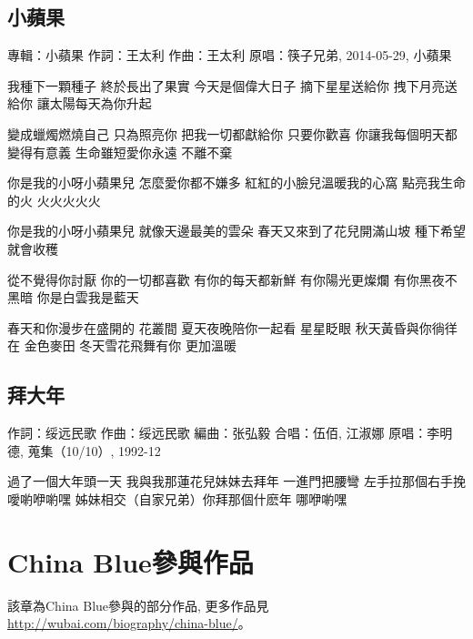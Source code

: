 \documentclass[UTF8,a4paper,oneside,twocolumn,12pt]{ctexbook}
\newcommand{\infopair}[2]{\textbullet #1：#2}
\newcommand{\zc}[1][伍佰]{\infopair{作詞}{#1}}
\newcommand{\zq}[1][伍佰]{\infopair{作曲}{#1}}
\newcommand{\bq}[1][伍佰]{\infopair{編曲}{#1}}
\newcommand{\zj}[1]{\infopair{專輯}{#1}}
\newcommand{\yc}[1]{\infopair{原唱}{#1}}
\newcommand{\sj}[1]{\infopair{時間}{#1}}
\newenvironment{info}{\begin{flushleft}\kaishu
	}
	{\end{flushleft}\normalsize\yahei\par}
\newenvironment{lyric}{
	}
{}
\begin{document}
\section{小蘋果}
\begin{info}
	\zj{小蘋果}
	\zc[王太利]
	\zq[王太利]
	\yc{筷子兄弟, 2014-05-29, 小蘋果}
\end{info}
\begin{lyric}
	我種下一顆種子 終於長出了果實
	今天是個偉大日子
	摘下星星送給你 拽下月亮送給你
	讓太陽每天為你升起

	變成蠟燭燃燒自己 只為照亮你
	把我一切都獻給你 只要你歡喜
	你讓我每個明天都 變得有意義
	生命雖短愛你永遠 不離不棄

	你是我的小呀小蘋果兒
	怎麼愛你都不嫌多
	紅紅的小臉兒溫暖我的心窩
	點亮我生命的火 火火火火火

	你是我的小呀小蘋果兒
	就像天邊最美的雲朵
	春天又來到了花兒開滿山坡
	種下希望就會收穫

	從不覺得你討厭 你的一切都喜歡
	有你的每天都新鮮
	有你陽光更燦爛 有你黑夜不黑暗
	你是白雲我是藍天

	春天和你漫步在盛開的 花叢間
	夏天夜晚陪你一起看 星星眨眼
	秋天黃昏與你徜徉在 金色麥田
	冬天雪花飛舞有你 更加溫暖
\end{lyric}

\section{拜大年}%
\begin{info}
	\zc[绥远民歌]%
	\zq[绥远民歌]
	\bq[张弘毅]
	\infopair{合唱}{伍佰, 江淑娜}
	\yc{李明德, 蒐集（10/10）, 1992-12}
\end{info}
\begin{lyric}
	過了一個大年頭一天
	我與我那蓮花兒妹妹去拜年
	一進門把腰彎
	左手拉那個右手挽
	噯喲咿喲嘿
	姊妹相交（自家兄弟）你拜那個什麽年
	哪咿喲嘿
\end{lyric}

\chapter{China Blue參與作品}
該章為China Blue參與的部分作品, 更多作品見 \url{http://wubai.com/biography/china-blue/}。%
\end{document}
